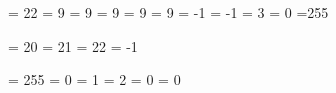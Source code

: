  = 22 %
 =  9 %
 =  9 %
 =  9 %
 =  9 %
 =  9 %
 = -1 %
 = -1 %
 =  3 %
 =  0 %
 =255 %

\countdef\insc@unt        = 20 %
\countdef\allocationnumber= 21 %
\countdef\m@ne            = 22 %
         \m@ne            = -1

\def\wlog{\immediate\write\m@ne} %


\countdef \count@   = 255
\dimendef \dimen@   =   0
\dimendef \dimen@i  =   1 %
\dimendef \dimen@ii =   2
\skipdef  \skip@    =   0
\toksdef  \toks@    =   0


\def\newcount   {\alloc@0\count   \countdef \insc@unt}
\def\newdimen   {\alloc@1\dimen   \dimendef \insc@unt}
\def\newskip    {\alloc@2\skip    \skipdef  \insc@unt}
\def\newmuskip  {\alloc@3\muskip  \muskipdef\@cclvi  }
\def\newbox     {\alloc@4\box     \chardef  \insc@unt}
\def\newtoks    {\alloc@5\toks    \toksdef  \@cclvi  }
\def\newread    {\alloc@6\read    \chardef  \sixt@@n }
\def\newwrite   {\alloc@7\write   \chardef  \sixt@@n }
\def\newfam     {\alloc@8\fam     \chardef  \sixt@@n }
\def\newlanguage{\alloc@9\language\chardef  \@cclvi  }

\def\newhelp#1#2{\newtoks#1#1\expandafter{\csname#2\endcsname}}

